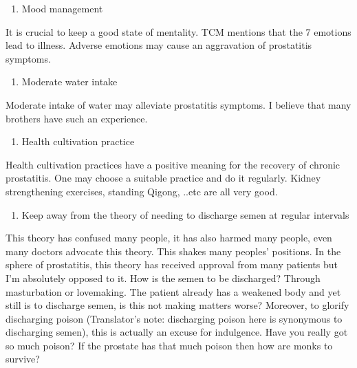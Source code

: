 \documentclass[
]{book}
\providecommand{\tightlist}{%
  \setlength{\itemsep}{0pt}\setlength{\parskip}{0pt}}
\begin{document}
\begin{enumerate}
\def\labelenumi{\arabic{enumi}.}
\setcounter{enumi}{6}
\tightlist
\item
  Mood management
\end{enumerate}

It is crucial to keep a good state of mentality. TCM mentions that the 7 emotions lead to illness. Adverse emotions may cause an aggravation of prostatitis symptoms.

\begin{enumerate}
\def\labelenumi{\arabic{enumi}.}
\setcounter{enumi}{7}
\tightlist
\item
  Moderate water intake
\end{enumerate}

Moderate intake of water may alleviate prostatitis symptoms. I believe that many brothers have such an experience.

\begin{enumerate}
\def\labelenumi{\arabic{enumi}.}
\setcounter{enumi}{8}
\tightlist
\item
  Health cultivation practice
\end{enumerate}

Health cultivation practices have a positive meaning for the recovery of chronic prostatitis. One may choose a suitable practice and do it regularly. Kidney strengthening exercises, standing Qigong, ..etc are all very good.

\begin{enumerate}
\def\labelenumi{\arabic{enumi}.}
\setcounter{enumi}{9}
\tightlist
\item
  Keep away from the theory of needing to discharge semen at regular intervals
\end{enumerate}

This theory has confused many people, it has also harmed many people, even many doctors advocate this theory. This shakes many peoples' positions. In the sphere of prostatitis, this theory has received approval from many patients but I'm absolutely opposed to it. How is the semen to be discharged? Through masturbation or lovemaking. The patient already has a weakened body and yet still is to discharge semen, is this not making matters worse? Moreover, to glorify discharging poison (Translator's note: discharging poison here is synonymous to discharging semen), this is actually an excuse for indulgence. Have you really got so much poison? If the prostate has that much poison then how are monks to survive?
\end{document}
